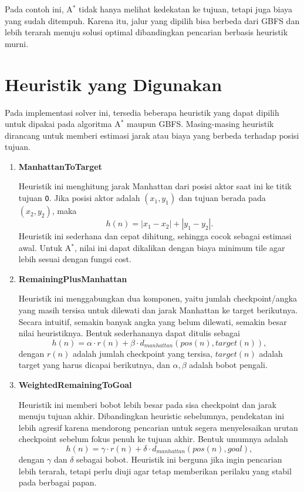 Pada contoh ini, A$^\ast$ tidak hanya melihat kedekatan ke tujuan, tetapi juga biaya yang sudah ditempuh. Karena itu, jalur yang dipilih bisa berbeda dari GBFS dan lebih terarah menuju solusi optimal dibandingkan pencarian berbasis heuristik murni.

\section{Heuristik yang Digunakan}
Pada implementasi solver ini, tersedia beberapa heuristik yang dapat dipilih untuk dipakai pada algoritma A$^\ast$ maupun GBFS. Masing-masing heuristik dirancang untuk memberi estimasi jarak atau biaya yang berbeda terhadap posisi tujuan.

\begin{enumerate}
    \item \textbf{ManhattanToTarget}

          Heuristik ini menghitung jarak Manhattan dari posisi aktor saat ini ke titik tujuan \texttt{O}. Jika posisi aktor adalah $(x_1, y_1)$ dan tujuan berada pada $(x_2, y_2)$, maka
          $$h(n) = |x_1 - x_2| + |y_1 - y_2|.$$
          Heuristik ini sederhana dan cepat dihitung, sehingga cocok sebagai estimasi awal. Untuk A$^\ast$, nilai ini dapat dikalikan dengan biaya minimum tile agar lebih sesuai dengan fungsi cost.

    \item \textbf{RemainingPlusManhattan}

          Heuristik ini menggabungkan dua komponen, yaitu jumlah checkpoint/angka yang masih tersisa untuk dilewati dan jarak Manhattan ke target berikutnya. Secara intuitif, semakin banyak angka yang belum dilewati, semakin besar nilai heuristiknya. Bentuk sederhananya dapat ditulis sebagai
          $$h(n) = \alpha \cdot r(n) + \beta \cdot d_{manhattan}(pos(n), target(n)),$$
          dengan $r(n)$ adalah jumlah checkpoint yang tersisa, $target(n)$ adalah target yang harus dicapai berikutnya, dan $\alpha, \beta$ adalah bobot pengali.

    \item \textbf{WeightedRemainingToGoal}

          Heuristik ini memberi bobot lebih besar pada sisa checkpoint dan jarak menuju tujuan akhir. Dibandingkan heuristic sebelumnya, pendekatan ini lebih agresif karena mendorong pencarian untuk segera menyelesaikan urutan checkpoint sebelum fokus penuh ke tujuan akhir. Bentuk umumnya adalah
          $$h(n) = \gamma \cdot r(n) + \delta \cdot d_{manhattan}(pos(n), goal),$$
          dengan $\gamma$ dan $\delta$ sebagai bobot. Heuristik ini berguna jika ingin pencarian lebih terarah, tetapi perlu diuji agar tetap memberikan perilaku yang stabil pada berbagai papan.
\end{enumerate}

